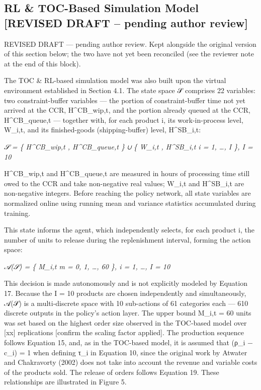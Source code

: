 \subsection{RL \& TOC-Based Simulation Model {[}REVISED DRAFT -- pending
author
review{]}}\label{rl-toc-based-simulation-model-revised-draft-pending-author-review}

\noindent\colorbox{yellow!40}{REVISED DRAFT --- pending author review. Kept alongside the original version of this section below; the two have not yet been reconciled (see the reviewer note at the end of this block).}\par\medskip

The TOC \& RL-based simulation model was also built upon the virtual
environment established in Section 4.1. The state space 𝒮 comprises 22
variables: two constraint-buffer variables --- the portion of
constraint-buffer time not yet arrived at the CCR, H\^{}CB\_wip,t, and
the portion already queued at the CCR, H\^{}CB\_queue,t --- together
with, for each product i, its work-in-process level, W\_i,t, and its
finished-goods (shipping-buffer) level, H\^{}SB\_i,t:

\emph{𝒮 = \{ H\^{}CB\_wip,t , H\^{}CB\_queue,t \} ∪ \{ W\_i,t ,
H\^{}SB\_i,t \textbar{} i = 1, \ldots, I \}, I = 10}

H\^{}CB\_wip,t and H\^{}CB\_queue,t are measured in hours of processing
time still owed to the CCR and take non-negative real values; W\_i,t and
H\^{}SB\_i,t are non-negative integers. Before reaching the policy
network, all state variables are normalized online using running mean
and variance statistics accumulated during training.

This state informs the agent, which independently selects, for each
product i, the number of units to release during the replenishment
interval, forming the action space:

\emph{𝒜(𝒮) = \{ M\_i,t \textbar{} m = 0, 1, \ldots, 60 \}, i = 1,
\ldots, I = 10}

This decision is made autonomously and is not explicitly modeled by
Equation 17. Because the I = 10 products are chosen independently and
simultaneously, 𝒜(𝒮) is a multi-discrete space with 10 sub-actions of 61
categories each --- 610 discrete outputs in the policy's action layer.
The upper bound M\_i,t = 60 units was set based on the highest order
size observed in the TOC-based model over {[}xx{]} replications
{[}confirm the scaling factor applied{]}. The production sequence
follows Equation 15, and, as in the TOC-based model, it is assumed that
(ρ\_i − c\_i) = 1 when defining τ\_i in Equation 10, since the original
work by Atwater and Chakravorty (2002) does not take into account the
revenue and variable costs of the products sold. The release of orders
follows Equation 19. These relationships are illustrated in Figure 5.

